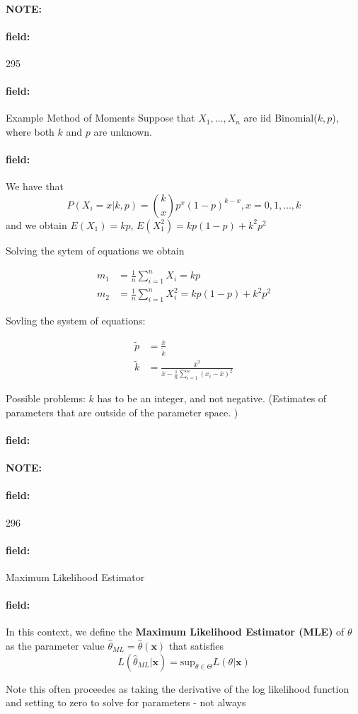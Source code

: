 \documentclass[12pt]{article}
\newenvironment{note}{\paragraph{NOTE:}}{}
\newenvironment{field}{\paragraph{field:}}{}
\begin{document}
\begin{note} \begin{field} \tiny 295 \end{field}
  \begin{field}
    Example Method of Moments
    Suppose that $X_1, \ldots , X_n$ are iid Binomial($k,p$), where both $k$ and $p$ are unknown.
  \end{field}
  \begin{field}
    We have that
    $$ P(X_i = x|k,p) = \binom{k}{x}p^x(1-p)^{k-x}, x = 0,1,\ldots,k$$
     and we obtain $E(X_1) = kp$, $E(X_1^2) = kp(1-p) + k^2p^2$

    Solving the sytem of equations we obtain

    \begin{align*}
      m_1 &= \frac{1}{n} \sum _{i = 1}^n X_i = kp\\
      m_2 &= \frac{1}{n} \sum _{i = 1}^n X_i^2 = kp(1-p) + k^2p^2
    \end{align*}

    Sovling the system of equations:

    \begin{align*}
      \tilde{p} &= \frac{\bar{x}}{\tilde{k}}\\
      \tilde{k} &= \frac{\bar{x}^2}{\bar{x} - \frac{1}{n} \sum _{i = 1}^n (x_i - \bar{x})^2}
    \end{align*}

    Possible problems: $k$ has to be an integer, and not negative. (Estimates of parameters that are outside of the parameter space. )
  \end{field}
  \begin{field}

  \end{field}
\end{note}



\begin{note} \begin{field} \tiny 296 \end{field}
  \begin{field}
    Maximum Likelihood Estimator
  \end{field}
  \begin{field}
    In this context, we define the \textbf{Maximum Likelihood Estimator (MLE)} of $\theta$ as the parameter value $\hat{\theta}_{ML} = \hat{\theta}(\mathbf{x})$ that satisfies
    $$L(\hat{\theta}_{ML}|\mathbf{x}) = \text{sup}_{\theta \in \Theta} L(\theta|\mathbf{x})$$

    Note this often proceedes as taking the derivative of the log likelihood function and setting to zero to solve for parameters - not always
  \end{field}
\end{note}
\end{document}
